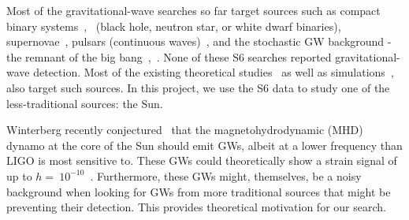 Most of the gravitational-wave searches so far target sources such as compact binary systems~\cite{bh1},~\cite{bh2} (black hole, neutron star, or white dwarf binaries), supernovae~\cite{supernovae}, pulsars (continuous waves)~\cite{pulsars}, and the stochastic GW background - the remnant of the big bang~\cite{sgwb},~\cite{sgwb2}. None of these S6 searches reported gravitational-wave detection. Most of the existing theoretical studies~\cite{theory2} as well as simulations~\cite{sim2},~\cite{sim}  also target such sources. In this project, we use the S6 data to study one of the less-traditional sources: the Sun.
\par{}
Winterberg recently conjectured~\cite{winterberg} that the magnetohydrodynamic (MHD) dynamo at the core of the Sun should emit GWs, albeit at a lower frequency than LIGO is most sensitive to. These GWs could theoretically show a strain signal of up to $h = ~10^{-10}$~\cite{winterberg}. Furthermore, these GWs might, themselves, be a noisy background when looking for GWs from more traditional sources that might be preventing their detection. This provides theoretical motivation for our search. 
